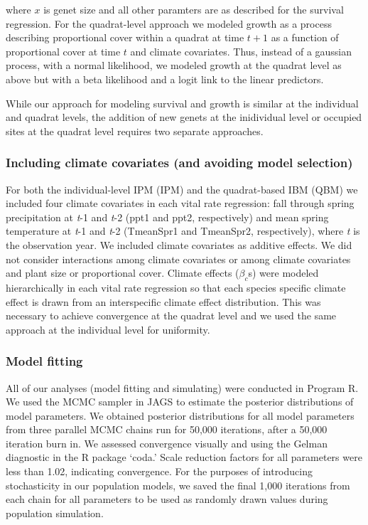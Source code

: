 \documentclass[author-year, 12pt,review]{components/elsarticle} %
\begin{document}
where $x$ is genet size and all other paramters are as described for the
survival regression. For the quadrat-level approach we modeled growth as
a process describing proportional cover within a quadrat at time $t+1$
as a function of proportional cover at time $t$ and climate covariates.
Thus, instead of a gaussian process, with a normal likelihood, we
modeled growth at the quadrat level as above but with a beta likelihood
and a logit link to the linear predictors.

While our approach for modeling survival and growth is similar at the
individual and quadrat levels, the addition of new genets at the
inidividual level or occupied sites at the quadrat level requires two
separate approaches.

\subsubsection{Including climate covariates (and avoiding model
selection)}\label{including-climate-covariates-and-avoiding-model-selection}

For both the individual-level IPM (IPM) and the quadrat-based IBM (QBM)
we included four climate covariates in each vital rate regression: fall
through spring precipitation at \emph{t}-1 and \emph{t}-2 (ppt1 and
ppt2, respectively) and mean spring temperature at \emph{t}-1 and
\emph{t}-2 (TmeanSpr1 and TmeanSpr2, respectively), where \emph{t} is
the observation year. We included climate covariates as additive
effects. We did not consider interactions among climate covariates or
among climate covariates and plant size or proportional cover. Climate
effects ($\beta_{c}$s) were modeled hierarchically in each vital rate
regression so that each species specific climate effect is drawn from an
interspecific climate effect distribution. This was necessary to achieve
convergence at the quadrat level and we used the same approach at the
individual level for uniformity.

\subsubsection{Model fitting}\label{model-fitting}

All of our analyses (model fitting and simulating) were conducted in
Program R. We used the MCMC sampler in JAGS to estimate the posterior
distributions of model parameters. We obtained posterior distributions
for all model parameters from three parallel MCMC chains run for 50,000
iterations, after a 50,000 iteration burn in. We assessed convergence
visually and using the Gelman diagnostic in the R package `coda.' Scale
reduction factors for all parameters were less than 1.02, indicating
convergence. For the purposes of introducing stochasticity in our
population models, we saved the final 1,000 iterations from each chain
for all parameters to be used as randomly drawn values during population
simulation.
\end{document}
